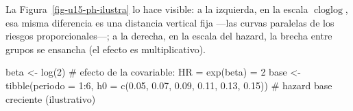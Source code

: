\documentclass[
  letterpaper,
  DIV=11,
  numbers=noendperiod]{scrartcl}
\newenvironment{Shaded}{\begin{snugshade}}{\end{snugshade}}
\newcommand{\AttributeTok}[1]{\textcolor[rgb]{0.40,0.45,0.13}{#1}}
\newcommand{\CommentTok}[1]{\textcolor[rgb]{0.37,0.37,0.37}{#1}}
\newcommand{\DecValTok}[1]{\textcolor[rgb]{0.68,0.00,0.00}{#1}}
\newcommand{\FloatTok}[1]{\textcolor[rgb]{0.68,0.00,0.00}{#1}}
\newcommand{\FunctionTok}[1]{\textcolor[rgb]{0.28,0.35,0.67}{#1}}
\newcommand{\NormalTok}[1]{\textcolor[rgb]{0.00,0.23,0.31}{#1}}
\newcommand{\OtherTok}[1]{\textcolor[rgb]{0.00,0.23,0.31}{#1}}
\newcommand{\SpecialCharTok}[1]{\textcolor[rgb]{0.37,0.37,0.37}{#1}}
\begin{document}
La Figura~\ref{fig-u15-ph-ilustra} lo hace visible: a la izquierda, en
la escala \(\operatorname{cloglog}\), esa misma diferencia es una
distancia vertical fija ---las curvas paralelas de los riesgos
proporcionales---; a la derecha, en la escala del hazard, la brecha
entre grupos se ensancha (el efecto es multiplicativo).

\begin{Shaded}
\begin{Highlighting}[]
\NormalTok{beta }\OtherTok{\textless{}{-}} \FunctionTok{log}\NormalTok{(}\DecValTok{2}\NormalTok{)                                  }\CommentTok{\# efecto de la covariable: HR = exp(beta) = 2}
\NormalTok{base }\OtherTok{\textless{}{-}} \FunctionTok{tibble}\NormalTok{(}\AttributeTok{periodo =} \DecValTok{1}\SpecialCharTok{:}\DecValTok{6}\NormalTok{,}
               \AttributeTok{h0 =} \FunctionTok{c}\NormalTok{(}\FloatTok{0.05}\NormalTok{, }\FloatTok{0.07}\NormalTok{, }\FloatTok{0.09}\NormalTok{, }\FloatTok{0.11}\NormalTok{, }\FloatTok{0.13}\NormalTok{, }\FloatTok{0.15}\NormalTok{))  }\CommentTok{\# hazard base creciente (ilustrativo)}


\end{Highlighting}
\end{Shaded}
\end{document}

